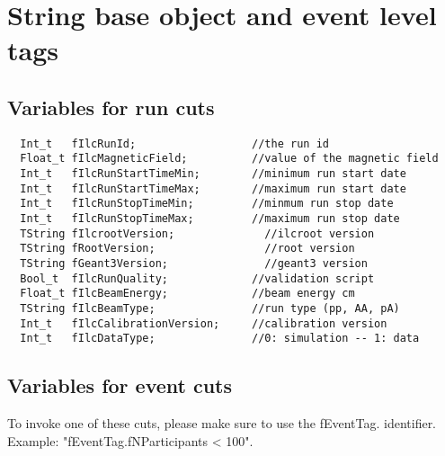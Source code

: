 \section{String base object and event level tags}
\label{App:StringCuts}
\subsection{Variables for run cuts}
{\ttfamily \noindent
\begin{verbatim}
  Int_t   fIlcRunId;                  //the run id
  Float_t fIlcMagneticField;          //value of the magnetic field
  Int_t   fIlcRunStartTimeMin;        //minimum run start date
  Int_t   fIlcRunStartTimeMax;        //maximum run start date
  Int_t   fIlcRunStopTimeMin;         //minmum run stop date
  Int_t   fIlcRunStopTimeMax;         //maximum run stop date
  TString fIlcrootVersion;              //ilcroot version
  TString fRootVersion;                 //root version
  TString fGeant3Version;               //geant3 version
  Bool_t  fIlcRunQuality;             //validation script
  Float_t fIlcBeamEnergy;             //beam energy cm
  TString fIlcBeamType;               //run type (pp, AA, pA)
  Int_t   fIlcCalibrationVersion;     //calibration version  
  Int_t   fIlcDataType;               //0: simulation -- 1: data  
\end{verbatim}
}
\subsection{Variables for event cuts}
To invoke one of these cuts, please make sure to use the {\ttfamily fEventTag.} identifier. Example: {\ttfamily "fEventTag.fNParticipants < 100"}.

